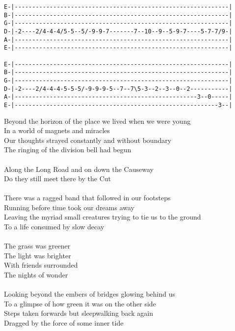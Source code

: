 \begin{verbatim}
E-|-------------------------------------------------------------|
B-|-------------------------------------------------------------|
G-|-------------------------------------------------------------|
D-|-2----2/4-4-4/5-5--5/-9-9-7-------7--10--9--5-9-7----5-7-7/9-|
A-|-------------------------------------------------------------|
E-|-------------------------------------------------------------|

E-|-------------------------------------------------------------|
B-|-------------------------------------------------------------|
G-|-------------------------------------------------------------|
D-|-2----2/4-4-4-5-5-5/-9-9-9-5--7--7\5-3--2--3--0--2-----------|
A-|----------------------------------------------------3--0-----|
E-|----------------------------------------------------------3--|
\end{verbatim}
Beyond the horizon of the place we lived when we were young \\
In a world of magnets and miracles \\
Our thoughts strayed constantly and without boundary \\
The ringing of the division bell had begun\\
\\
Along the Long Road and on down the Causeway \\
Do they still meet there by the Cut\\
\\
There was a ragged band that followed in our footsteps \\
Running before time took our dreams away \\
Leaving the myriad small creatures trying to tie us to the ground \\
To a life consumed by slow decay\\
\\
The grass was greener \\
The light was brighter \\
With friends surrounded \\
The nights of wonder\\
\\
Looking beyond the embers of bridges glowing behind us \\
To a glimpse of how green it was on the other side \\
Steps taken forwards but sleepwalking back again \\
Dragged by the force of some inner tide\\
\\
